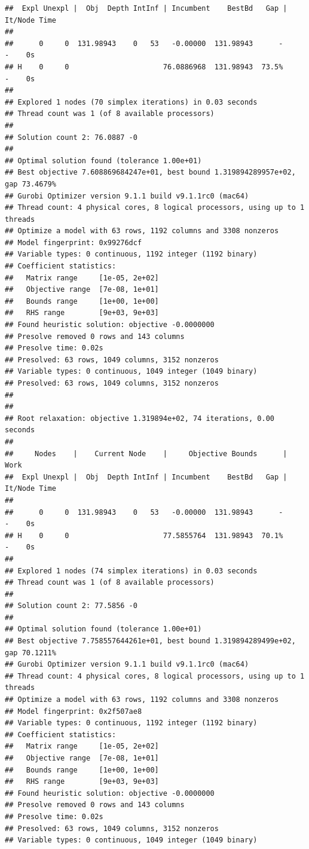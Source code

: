 \documentclass[
  12pt,
]{book}
\begin{document}
\begin{verbatim}
##  Expl Unexpl |  Obj  Depth IntInf | Incumbent    BestBd   Gap | It/Node Time
## 
##      0     0  131.98943    0   53   -0.00000  131.98943      -     -    0s
## H    0     0                      76.0886968  131.98943  73.5%     -    0s
## 
## Explored 1 nodes (70 simplex iterations) in 0.03 seconds
## Thread count was 1 (of 8 available processors)
## 
## Solution count 2: 76.0887 -0 
## 
## Optimal solution found (tolerance 1.00e+01)
## Best objective 7.608869684247e+01, best bound 1.319894289957e+02, gap 73.4679%
## Gurobi Optimizer version 9.1.1 build v9.1.1rc0 (mac64)
## Thread count: 4 physical cores, 8 logical processors, using up to 1 threads
## Optimize a model with 63 rows, 1192 columns and 3308 nonzeros
## Model fingerprint: 0x99276dcf
## Variable types: 0 continuous, 1192 integer (1192 binary)
## Coefficient statistics:
##   Matrix range     [1e-05, 2e+02]
##   Objective range  [7e-08, 1e+01]
##   Bounds range     [1e+00, 1e+00]
##   RHS range        [9e+03, 9e+03]
## Found heuristic solution: objective -0.0000000
## Presolve removed 0 rows and 143 columns
## Presolve time: 0.02s
## Presolved: 63 rows, 1049 columns, 3152 nonzeros
## Variable types: 0 continuous, 1049 integer (1049 binary)
## Presolved: 63 rows, 1049 columns, 3152 nonzeros
## 
## 
## Root relaxation: objective 1.319894e+02, 74 iterations, 0.00 seconds
## 
##     Nodes    |    Current Node    |     Objective Bounds      |     Work
##  Expl Unexpl |  Obj  Depth IntInf | Incumbent    BestBd   Gap | It/Node Time
## 
##      0     0  131.98943    0   53   -0.00000  131.98943      -     -    0s
## H    0     0                      77.5855764  131.98943  70.1%     -    0s
## 
## Explored 1 nodes (74 simplex iterations) in 0.03 seconds
## Thread count was 1 (of 8 available processors)
## 
## Solution count 2: 77.5856 -0 
## 
## Optimal solution found (tolerance 1.00e+01)
## Best objective 7.758557644261e+01, best bound 1.319894289499e+02, gap 70.1211%
## Gurobi Optimizer version 9.1.1 build v9.1.1rc0 (mac64)
## Thread count: 4 physical cores, 8 logical processors, using up to 1 threads
## Optimize a model with 63 rows, 1192 columns and 3308 nonzeros
## Model fingerprint: 0x2f507ae8
## Variable types: 0 continuous, 1192 integer (1192 binary)
## Coefficient statistics:
##   Matrix range     [1e-05, 2e+02]
##   Objective range  [7e-08, 1e+01]
##   Bounds range     [1e+00, 1e+00]
##   RHS range        [9e+03, 9e+03]
## Found heuristic solution: objective -0.0000000
## Presolve removed 0 rows and 143 columns
## Presolve time: 0.02s
## Presolved: 63 rows, 1049 columns, 3152 nonzeros
## Variable types: 0 continuous, 1049 integer (1049 binary)

\end{verbatim}
\end{document}
